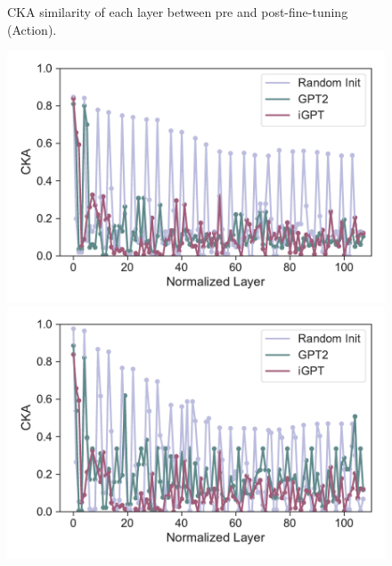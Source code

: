 \documentclass{article}
\begin{document}
\begin{figure}[H]
\begin{minipage}[b]{0.32\linewidth}
    \end{minipage}
    \caption{CKA similarity of each layer between pre and post-fine-tuning (Action).}
\end{figure}

\begin{figure}[H]
    \centering
    \begin{minipage}[b]{0.32\linewidth}
        \includegraphics[width=\linewidth]{figs/cka_plot_40_gpt2_igpt_dt_hopper_medium_666_reward.pdf}
    \end{minipage}
    \begin{minipage}[b]{0.32\linewidth}
        \includegraphics[width=\linewidth]{figs/cka_plot_40_gpt2_igpt_dt_halfcheetah_medium_666_reward.pdf}
    \end{minipage}
    \begin{minipage}[b]{0.32\linewidth}

\end{minipage}
\end{figure}
\end{document}
